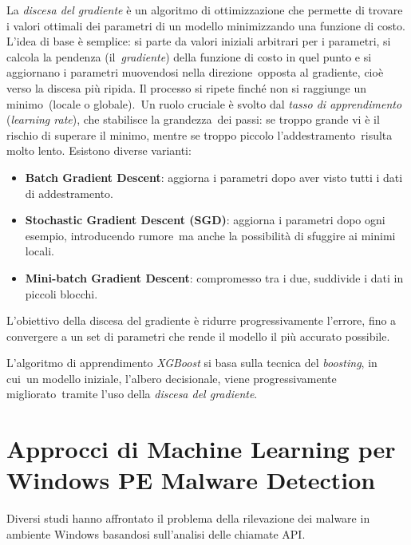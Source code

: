 La \textit{discesa del gradiente} è un algoritmo di ottimizzazione che permette di trovare i valori ottimali dei
parametri di un modello minimizzando una funzione di costo.
L'idea di base è semplice: si parte da valori iniziali arbitrari per i parametri, si calcola la pendenza (il\
\textit{gradiente}) della funzione di costo in quel punto e si aggiornano i parametri muovendosi nella direzione\
opposta al gradiente, cioè verso la discesa più ripida. Il processo si ripete finché non si raggiunge un minimo\
(locale o globale).\
Un ruolo cruciale è svolto dal \textit{tasso di apprendimento} (\textit{learning rate}), che stabilisce la grandezza\
dei passi: se troppo grande vi è il rischio di superare il minimo, mentre se troppo piccolo l'addestramento\
risulta molto lento. Esistono diverse varianti:\
\begin{itemize}
      \item \textbf{Batch Gradient Descent}: aggiorna i parametri dopo aver visto tutti i dati di addestramento.
      \item \textbf{Stochastic Gradient Descent (SGD)}: aggiorna i parametri dopo ogni esempio, introducendo rumore\
            ma anche la possibilità di sfuggire ai minimi locali.
      \item \textbf{Mini-batch Gradient Descent}: compromesso tra i due, suddivide i dati in piccoli blocchi.
\end{itemize}

L'obiettivo della discesa del gradiente è ridurre progressivamente l'errore, fino a convergere a un set di
parametri che rende il modello il più accurato possibile.

L'algoritmo di apprendimento \textit{XGBoost} si basa sulla tecnica del \textit{boosting}, in cui\
un modello iniziale, l'albero decisionale, viene progressivamente migliorato\
tramite l'uso della \textit{discesa del gradiente}.

\section{Approcci di Machine Learning per Windows PE Malware Detection}

Diversi studi hanno affrontato il problema della rilevazione dei malware in ambiente Windows
basandosi sull'analisi delle chiamate API.

